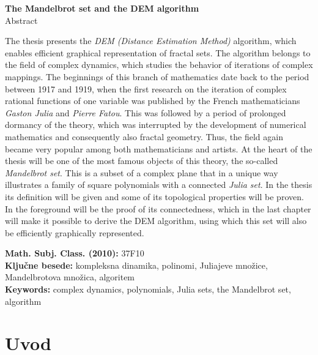\documentclass[12pt,a4paper]{amsart}
\theoremstyle{definition} %
\theoremstyle{plain} %
\begin{document}
\vfill
\begin{center}
{\bf The Mandelbrot set and the DEM algorithm}\\[3mm] %
{\sc Abstract}
\end{center}
The thesis presents the {\em DEM (Distance Estimation Method)} algorithm, 
which enables efficient graphical representation of fractal sets. 
The algorithm belongs to the field of complex dynamics, 
which studies the behavior of iterations of complex mappings. 
The beginnings of this branch of mathematics date back to the period between 1917 and 1919, 
when the first research on the iteration of complex rational functions of one variable was published by the French mathematicians {\em Gaston Julia} and {\em Pierre Fatou}. 
This was followed by a period of prolonged dormancy of the theory, 
which was interrupted by the development of numerical mathematics and consequently also fractal geometry. 
Thus, the field again became very popular among both mathematicians and artists.
At the heart of the thesis will be one of the most famous objects of this theory, the so-called {\em Mandelbrot set}. 
This is a subset of a complex plane that in a unique way illustrates a family of square polynomials with a connected {\em Julia set}. 
In the thesis its definition will be given and some of its topological properties will be proven. 
In the foreground will be the proof of its connectedness, which in the last chapter will make it possible to derive the DEM algorithm, 
using which this set will also be efficiently graphically represented.

\vfill\noindent
{\bf Math. Subj. Class. (2010):} 37F10  \\[1mm]  
{\bf Ključne besede:} kompleksna dinamika, polinomi, Juliajeve množice, Mandelbrotova množica, algoritem \\ [1mm]  
{\bf Keywords:} complex dynamics, polynomials, Julia sets, the Mandelbrot set, algorithm
\pagebreak



\section{Uvod}
\end{document}
